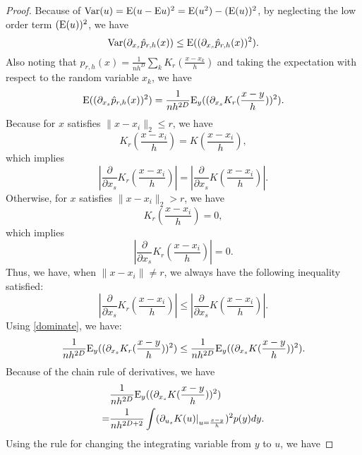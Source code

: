 \documentclass[aos,preprint]{imsart}
\theoremstyle{remark}
\begin{document}
\begin{appendix}
\begin{proof}\label{Derivatives' Variance for LKDE}
Because of ${{\rm Var}}(u) = {\rm E}(u - {\rm E}u)^2 = {\rm E}(u^2) - ({\rm E}(u))^2$, by neglecting the low order  term $({\rm E}(u))^2$,  we have
\begin{equation}\label{step1}
{{\rm Var}}(\partial_{x_s} \hat{p}_{r,h}(x)) \leq {\rm E} ((\partial_{x_s} \hat{p}_{r,h}(x))^2) .
\end{equation}
Also noting that $\hat{p}_{r,h}(x)=\frac{1}{n h^D} \sum_k K_r(\frac{x-x_k}{h})$ and taking the expectation with respect to the random variable $x_k$, we have
\begin{equation}\label{step2}
 {\rm E} ((\partial_{x_s} \hat{p}_{r,h}(x))^2) = \frac{1}{n h^{2D}} {\rm E}_y ((\partial_{x_s } K_r (\frac{x - y}{h}))^2).
\end{equation}
Because for $x$ satisfies $\|x-x_i\|_2\leq r$, we have 
\[
K_r(\frac{x-x_i}{h}) = K(\frac{x-x_i}{h}),
\]
which implies 
\[
|\frac{\partial }{\partial x_s }K_r(\frac{x-x_i}{h})| = | \frac{\partial }{\partial x_s }K(\frac{x-x_i}{h} )|.
\]
Otherwise, for $x$ satisfies $\|x-x_i\|_2> r$, we have
\[
K_r(\frac{x-x_i}{h}) =0,
\]
which implies
\[
|\frac{\partial }{\partial x_s }K_r(\frac{x-x_i}{h})| = 0.
\]
Thus, we have, when $\|x-x_i\|\neq r$, we always have the following inequality satisfied:
\begin{equation}\label{dominate}
|\frac{\partial}{\partial x_s} K_r(\frac{x-x_i}{h}) | \leq |\frac{\partial}{\partial x_s} K(\frac{x-x_i}{h})|.
\end{equation}
Using \eqref{dominate}, %
we have:
\begin{equation}\label{step3}
\frac{1}{n h^{2D}} {\rm E}_y ((\partial_{x_s } K_r (\frac{x - y}{h}))^2) \leq \frac{1}{n h^{2D}} {\rm E}_y ((\partial_{x_s } K(\frac{x - y}{h}))^2).
\end{equation}
Because of the chain rule of derivatives, we have
\begin{equation}\label{step4}
\begin{aligned}
&\frac{1}{n h^{2D}} {\rm E}_y ((\partial_{x_s} K(\frac{x - y}{h}))^2) \\
= &\frac{1}{n h^{2D+2}} \int (\partial_{u_s } K (u) |_{u=\frac{x - y}{h}})^2 p(y) dy.
\end{aligned}
\end{equation}
Using the rule for changing the integrating variable from $y$ to $u$, we have 

\end{proof}
\end{appendix}
\end{document}
